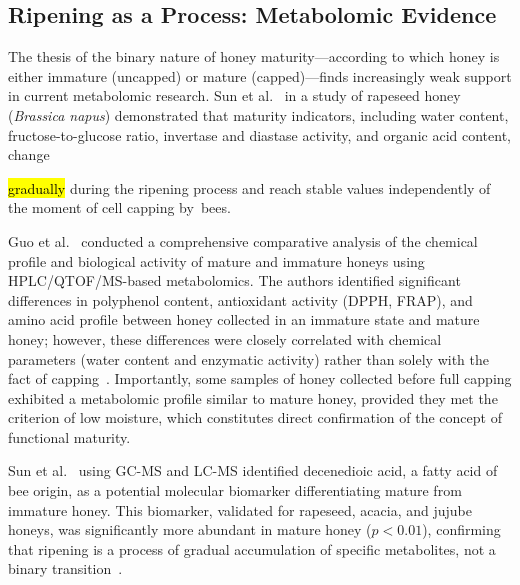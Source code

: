 \documentclass[foods,review,accept,pdftex,moreauthors]{Definitions/mdpi}
\begin{document}
\subsection{Ripening as a Process: Metabolomic Evidence}

The thesis of the binary nature of honey maturity---according to
which honey is either immature (uncapped) or mature (capped)---finds increasingly weak support in current metabolomic research.
Sun et al.~\cite{sun2021} in a study of rapeseed honey
(\textit{Brassica napus}) demonstrated that maturity indicators,
including water content, fructose-to-glucose ratio, invertase and
diastase activity, and organic acid content, change {\hl{gradually}
during the ripening process and reach stable values independently
of the moment of cell capping \mbox{by bees.}

Guo et al.~\cite{guo2020} conducted a comprehensive comparative
analysis of the chemical profile and biological activity of mature
and immature honeys using HPLC/QTOF/MS-based metabolomics. The
authors identified significant differences in polyphenol content,
antioxidant activity (DPPH, FRAP), and amino acid profile between
honey collected in an immature state and mature honey; however,
these differences were closely correlated with chemical parameters
(water content and enzymatic activity) rather than solely with
the fact of capping~\cite{guo2020}. Importantly, some samples of
honey collected before full capping exhibited a metabolomic profile
similar to mature honey, provided they met the criterion of low
moisture, which constitutes direct confirmation of the concept
of functional maturity.

Sun et al.~\cite{sun2021} using GC-MS and LC-MS identified
decenedioic acid, a fatty acid of bee origin, as a potential
molecular biomarker differentiating mature from immature honey.
This biomarker, validated for rapeseed, acacia, and jujube honeys,
was significantly more abundant in mature honey ($p < 0.01$),
confirming that ripening is a process of gradual accumulation of
specific metabolites, not a binary transition~\cite{sun2021}.


}
\end{document}
